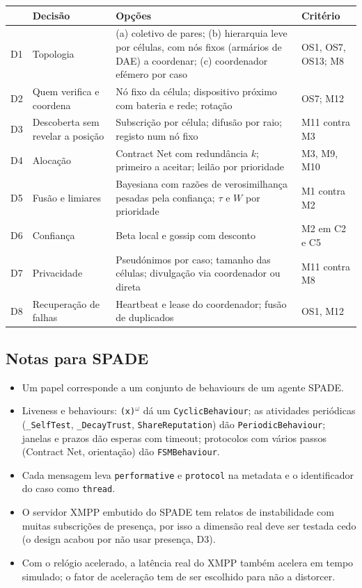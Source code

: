 \documentclass[10pt,a4paper]{article}
\newcommand{\om}{$^{\omega}$}
\newcommand{\id}[1]{\texttt{#1}}
\begin{document}
{\small
\noindent\begin{tabularx}{\linewidth}{@{}lP{3.8cm}LP{3cm}@{}}
\toprule
& Decisão & Opções & Critério \\
\midrule
D1 & Topologia & (a) coletivo de pares; (b) hierarquia leve por células, com nós fixos (armários de DAE) a coordenar; (c) coordenador efémero por caso & OS1, OS7, OS13; M8 \\
D2 & Quem verifica e coordena & Nó fixo da célula; dispositivo próximo com bateria e rede; rotação & OS7; M12 \\
D3 & Descoberta sem revelar a posição & Subscrição por célula; difusão por raio; registo num nó fixo & M11 contra M3 \\
D4 & Alocação & Contract Net com redundância $k$; primeiro a aceitar; leilão por prioridade & M3, M9, M10 \\
D5 & Fusão e limiares & Bayesiana com razões de verosimilhança pesadas pela confiança; $\tau$ e $W$ por prioridade & M1 contra M2 \\
D6 & Confiança & Beta local e gossip com desconto & M2 em C2 e C5 \\
D7 & Privacidade & Pseudónimos por caso; tamanho das células; divulgação via coordenador ou direta & M11 contra M8 \\
D8 & Recuperação de falhas & Heartbeat e lease do coordenador; fusão de duplicados & OS1, M12 \\
\bottomrule
\end{tabularx}
}

\subsection{Notas para SPADE}\label{sec:spade}

{\raggedright
\begin{itemize}
\item Um papel corresponde a um conjunto de behaviours de um agente SPADE.
\item Liveness e behaviours: \id{(x)}\om{} dá um \id{CyclicBehaviour}; as atividades periódicas (\id{\_SelfTest}, \id{\_DecayTrust}, \id{ShareReputation}) dão \id{PeriodicBehaviour}; janelas e prazos dão esperas com timeout; protocolos com vários passos (Contract Net, orientação) dão \id{FSMBehaviour}.
\item Cada mensagem leva \id{performative} e \id{protocol} na metadata e o identificador do caso como \id{thread}.
\item O servidor XMPP embutido do SPADE tem relatos de instabilidade com muitas subscrições de presença, por isso a dimensão real deve ser testada cedo (o design acabou por não usar presença, D3).
\item Com o relógio acelerado, a latência real do XMPP também acelera em tempo simulado; o fator de aceleração tem de ser escolhido para não a distorcer.
\end{itemize}
}
\end{document}
